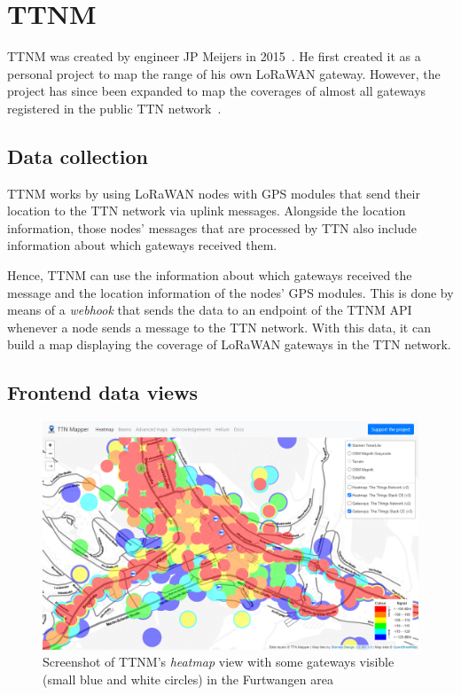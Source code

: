 
\section{\acf{TTNM}}

\acf{TTNM} was created by engineer JP Meijers in 2015~\cite{linkedin_23_nodate}.
He first created it as a personal project to map the range of his own \ac{LoRaWAN} gateway.
However, the project has since been expanded to map the coverages of almost all gateways registered in the public \ac{TTN} network~\cite{the_things_network_jp_2018}.

\subsection{Data collection}

\acl{TTNM} works by using \ac{LoRaWAN} nodes with \ac{GPS} modules that send their location to the \ac{TTN} network via uplink messages.
Alongside the location information, those nodes' messages that are processed by \ac{TTN} also include information about which gateways received them.

Hence, \acl{TTNM} can use the information about which gateways received the message and the location information of the nodes' \ac{GPS} modules.
This is done by means of a \emph{webhook} that sends the data to an endpoint of the \acl{TTNM} \ac{API} whenever a node sends a message to the \ac{TTN} network.
With this data, it can build a map displaying the coverage of \ac{LoRaWAN} gateways in the \ac{TTN} network.

\subsection{Frontend data views}

\begin{figure}
    \centering
    \includegraphics[width=1\textwidth]{pictures/ttn-mapper/heatmap_with_gateways.png}
    \caption{Screenshot of \ac{TTNM}'s \emph{heatmap} view with some gateways visible (small blue and white circles) in the Furtwangen area~\protect\cite{ttn_mapper_ttn_2023}}\label{pic:ttn-mapper-heatmap-with-gateways}
\end{figure}

